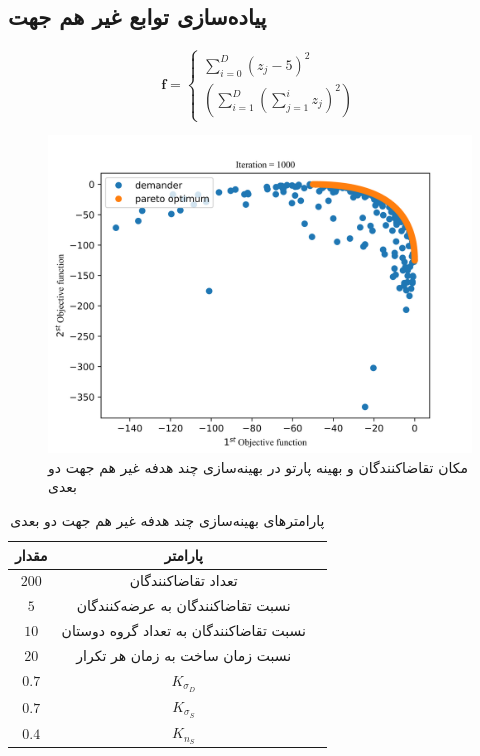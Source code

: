 \subsection{پیاده‌سازی توابع غیر هم جهت}

\begin{equation}
	\boldsymbol{f} = 
	\begin{cases}
		\sum_{i=0}^{D}(z_j-5)^2 \\
		\left(\sum_{i=1}^{D}\left(\sum_{j=1}^{i}z_j\right)^2\right)
	\end{cases}
\end{equation}



\begin{figure}[H]
	\includegraphics[width=16cm]{../Figure/results/non_cooperative_2d.png}
	\centering
	\caption{مکان تقاضا‌کنندگان و بهینه پارتو در بهینه‌سازی چند هدفه غیر هم جهت دو بعدی}
\end{figure}

\begin{table}[H]
	\caption{پارامترهای بهینه‌سازی چند هدفه غیر هم جهت دو بعدی}
	\centering
	\begin{tabular}{|c|c|c|}
		\hline
		مقدار & پارامتر\\
		\hline
		$200$ 
		& تعداد تقاضا‌کنندگان\\
		$5$ 
		& نسبت تقاضاکنندگان به عرضه‌کنندگان \\
		$	10 $
		& نسبت تقاضاکنندگان به تعداد گروه دوستان\\
		$20$ 
		& نسبت زمان ساخت به زمان هر تکرار \\
		$0.7 $ &$K_{\sigma_D}$ \\
		$0.7$ &$K_{\sigma_S}$ \\
		$0.4$ &$K_{n_S}$ \\
		
		\hline
	\end{tabular}
\end{table}









